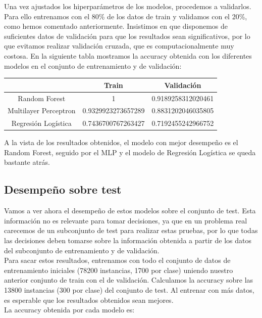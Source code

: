 \documentclass[a4]{article}
\begin{document}
Una vez ajustados los hiperparámetros de los modelos, procedemos a validarlos. Para ello entrenamos con el 80\% de los datos de train y validamos con el 20\%, como hemos comentado anteriormente. Insistimos en que disponemos de suficientes datos de validación para que los resultados sean significativos, por lo que evitamos realizar validación cruzada, que es computacionalmente muy costosa. En la siguiente tabla mostramos la accuracy obtenida con los diferentes modelos en el conjunto de entrenamiento y de validación:

\begin{center}
\begin{tabular}{|c|c|c|}
  \hline
  \multicolumn{1}{|c|}{}& \textbf{Train} & \textbf{Validación}  \\ \hline
  Random Forest         & 1                  & 0.9189258312020461\\
  Multilayer Perceptron & 0.9329923273657289 & 0.8831202046035805 \\
  Regresión Logística   & 0.7436700767263427 & 0.7192455242966752 \\\hline
\end{tabular}
\end{center}

A la vista de los resultados obtenidos, el modelo con mejor desempeño es el Random Forest, seguido por el MLP y el modelo de Regresión Logística se queda bastante atrás.

\subsection{Desempeño sobre test}

Vamos a ver ahora el desempeño de estos modelos sobre el conjunto de
test. Esta información no es relevante para tomar decisiones, ya que
en un problema real carecemos de un subconjunto de test para realizar
estas pruebas, por lo que todas las decisiones deben tomarse sobre la
información obtenida a partir de los datos del subconjunto de
entrenamiento y de validación.\\ Para sacar estos resultados,
entrenamos con todo el conjunto de datos de entrenamiento iniciales
(78200 instancias, 1700 por clase) uniendo nuestro anterior conjunto
de train con el de validación. Calculamos la accuracy sobre las 13800
instancias (300 por clase) del conjunto de test. Al entrenar con más
datos, es esperable que los resultados obtenidos sean mejores.\\
La accuracy obtenida por cada modelo es:
\end{document}
